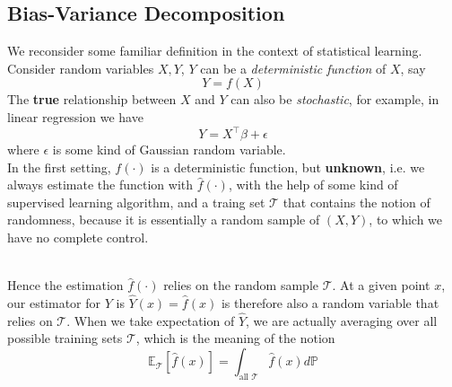 \documentclass[a4paper, 11pt]{article}
\begin{document}
\subsection{Bias-Variance Decomposition}
We reconsider some familiar definition in the context of statistical learning. Consider random variables $X, Y$, $Y$ can be a \emph{deterministic function} of $X$, say
$$
Y = f(X)
$$
The \textbf{true} relationship between $X$ and $Y$ can also be \emph{stochastic}, for example, in linear regression we have
$$
Y = X^{\top} \beta + \epsilon 
$$
where $\epsilon$ is some kind of Gaussian random variable. 
~\\
In the first setting, $f(\cdot)$ is a deterministic function, but \textbf{unknown}, i.e. we always estimate the function with $\hat{f}(\cdot)$, with the help of some kind of supervised learning algorithm, and a traing set $\mathcal{T}$ that contains the notion of randomness, because it is essentially a random sample of $(X, Y)$, to which we have no complete control. 

~\\
Hence the estimation $\hat{f}(\cdot)$ relies on the random sample $\mathcal{T}$. At a given point $x$, our estimator for $Y$ is $\hat{Y}(x) = \hat{f}(x)$ is therefore also a random variable that relies on $\mathcal{T}$. When we take expectation of $\hat{Y}$, we are actually averaging over all possible training sets $\mathcal{T}$, which is the meaning of the notion 
$$
\mathbb{E}_{\mathcal{T}}\left[\hat{f}(x)\right] = \int_{\text{all } \mathcal{T}} \hat{f}(x) d\mathbb{P}
$$
\end{document}
